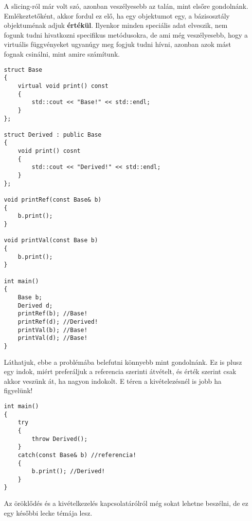 \documentclass[a4paper,11.5pt]{article}
\begin{document}
	A slicing-ról már volt szó, azonban veszélyesebb az talán, mint elsőre gondolnánk. Emlékeztetőként, akkor fordul ez elő, ha egy objektumot egy, a bázisosztály objektuménak adjuk \textbf{értékül}. Ilyenkor minden speciális adat elveszik, nem fogunk tudni hivatkozni specifikus metódusokra, de ami még veszélyesebb, hogy a virtuális függvényeket ugyanúgy meg fogjuk tudni hívni, azonban azok mást fognak csinálni, mint amire számítunk.
	\begin{lstlisting}
struct Base
{
	virtual void print() const
	{
		std::cout << "Base!" << std::endl;
	}	
};

struct Derived : public Base
{
	void print() cosnt
	{
		std::cout << "Derived!" << std::endl;
	}	
};

void printRef(const Base& b)
{
	b.print();
}

void printVal(const Base b)
{
	b.print();
}

int main()
{
	Base b;
	Derived d;
	printRef(b); //Base!
	printRef(d); //Derived!
	printVal(b); //Base!
	printVal(d); //Base!
}
	\end{lstlisting}
	Láthatjuk, ebbe a problémába belefutni könnyebb mint gondolnánk. Ez is plusz egy indok, miért preferáljuk a referencia szerinti átvételt, és érték szerint csak akkor veszünk át, ha nagyon indokolt. E téren a kivételezésnél is jobb ha figyelünk!
	\begin{lstlisting}
int main()
{
	try
	{
		throw Derived();
	}
	catch(const Base& b) //referencia!
	{
		b.print(); //Derived!
	}
}
	\end{lstlisting}
	Az öröklődés és a kivételkezelés kapcsolatárólról még sokat lehetne beszélni, de ez egy későbbi lecke témája lesz.
\end{document}
